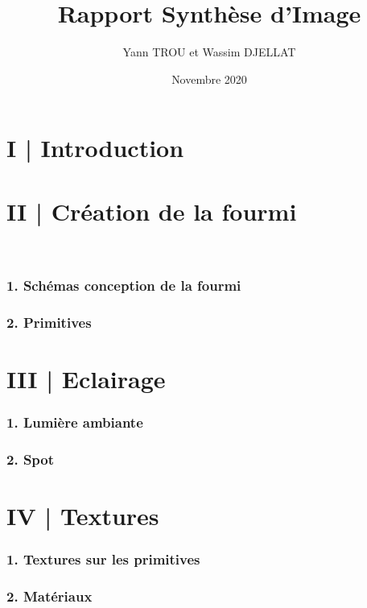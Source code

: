 \documentclass[11pt]{article}
\title{Rapport Synthèse d'Image}
\author{Yann TROU et Wassim DJELLAT}
\date{Novembre 2020}
\begin{document}
\maketitle
\tableofcontents
    \vspace{\baselineskip}
    \vspace{\baselineskip}
    
    \chapter{\Large{I | Introduction}}
    \vspace{\baselineskip}
 
    \chapter{\Large{II | Création de la fourmi}} \\
    \begin{center}
        \subsection*{1. Schémas conception de la fourmi}
        \subsection*{2. Primitives}
    \end{center}
    \vspace{\baselineskip}
    
    \chapter{\Large {III | Eclairage}}
    \begin{center}
        \subsection*{1. Lumière ambiante}
        \subsection*{2. Spot}
    \end{center}
    
    \chapter{\Large {IV | Textures}}
    \begin{center}
        \subsection*{1. Textures sur les primitives}
        \subsection*{2. Matériaux}
    \end{center}
    \vspace{\baselineskip}
    
\end{document}
